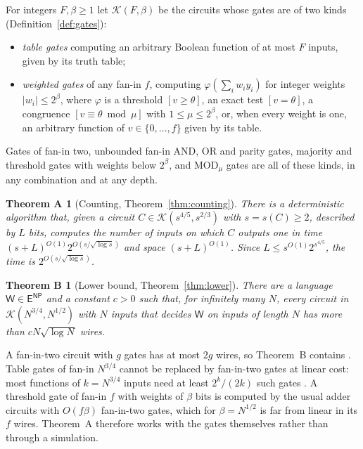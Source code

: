 \documentclass[11pt,reqno]{amsart}
\numberwithin{equation}{section}
\theoremstyle{plain}
\newtheorem*{theoremA}{Theorem A}
\newtheorem*{theoremB}{Theorem B}
\theoremstyle{definition}
\theoremstyle{remark}
\newcommand{\cK}{\mathcal{K}}
\newcommand{\ENP}{\mathsf{E}^{\mathsf{NP}}}
\newcommand{\Wl}{\mathsf{W}}
\begin{document}
For integers $F,\beta\ge 1$ let $\cK(F,\beta)$ be the circuits whose gates are of
two kinds (Definition~\ref{def:gates}):
\begin{itemize}[leftmargin=2em]
\item \emph{table gates} computing an arbitrary Boolean function of at most $F$
inputs, given by its truth table;
\item \emph{weighted gates} of any fan-in $f$, computing $\varphi(\sum_i
w_iy_i)$ for integer weights $|w_i|\le 2^{\beta}$, where $\varphi$ is a
threshold $[v\ge\theta]$, an exact test $[v=\theta]$, a congruence
$[v\equiv\theta\bmod\mu]$ with $1\le\mu\le2^\beta$, or, when every weight is
one, an arbitrary function of $v\in\{0,\dots,f\}$ given by its table.
\end{itemize}
Gates of fan-in two, unbounded fan-in AND, OR and parity gates, majority and
threshold gates with weights below $2^\beta$, and $\mathrm{MOD}_\mu$ gates are
all of these kinds, in any combination and at any depth.

\begin{theoremA}[Counting, Theorem~\ref{thm:counting}]
There is a deterministic algorithm that, given a circuit $C\in\cK(s^{4/5},s^{2/3})$
with $s=s(C)\ge 2$, described by $L$ bits, computes the number of inputs on which
$C$ outputs one in time $(s+L)^{O(1)}2^{O(s/\sqrt{\log s})}$ and space
$(s+L)^{O(1)}$. Since $L\le s^{O(1)}2^{s^{4/5}}$, the time is
$2^{O(s/\sqrt{\log s})}$.
\end{theoremA}

\begin{theoremB}[Lower bound, Theorem~\ref{thm:lower}]
There are a language $\Wl\in\ENP$ and a constant $c>0$ such that, for
infinitely many $N$, every circuit in $\cK(N^{3/4},N^{1/2})$ with $N$ inputs
that decides $\Wl$ on inputs of length $N$ has more than $cN\sqrt{\log N}$ wires.
\end{theoremB}

A fan-in-two circuit with $g$ gates has at most $2g$ wires, so Theorem~B
contains \cite[Corollary 1.4]{OAI26}. Table gates of fan-in $N^{3/4}$ cannot be
replaced by fan-in-two gates at linear cost: most functions of $k=N^{3/4}$
inputs need at least $2^k/(2k)$ such gates \cite{Sha49}. A threshold gate of
fan-in $f$ with weights of $\beta$ bits is computed by the usual adder circuits
with $O(f\beta)$ fan-in-two gates, which for $\beta=N^{1/2}$ is far from linear
in its $f$ wires. Theorem~A therefore works with the gates themselves rather
than through a simulation.
\end{document}

